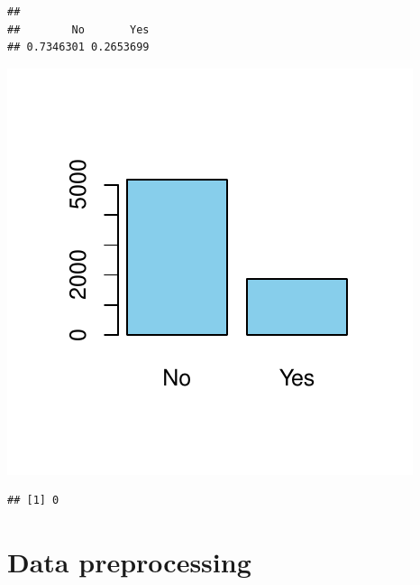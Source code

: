 \documentclass[
  twoside]{article}
\newenvironment{Shaded}{\begin{snugshade}}{\end{snugshade}}
\newcommand{\AttributeTok}[1]{\textcolor[rgb]{0.13,0.29,0.53}{#1}}
\newcommand{\FunctionTok}[1]{\textcolor[rgb]{0.13,0.29,0.53}{\textbf{#1}}}
\newcommand{\NormalTok}[1]{#1}
\newcommand{\SpecialCharTok}[1]{\textcolor[rgb]{0.81,0.36,0.00}{\textbf{#1}}}
\newcommand{\StringTok}[1]{\textcolor[rgb]{0.31,0.60,0.02}{#1}}
\begin{document}
\begin{verbatim}
## 
##        No       Yes 
## 0.7346301 0.2653699
\end{verbatim}

\begin{Shaded}
\end{Shaded}

\includegraphics{Assigment2_files/figure-latex/unnamed-chunk-37-1.pdf}

\begin{Shaded}
\end{Shaded}

\begin{verbatim}
## [1] 0
\end{verbatim}

\hypertarget{data-preprocessing}{%
\section{Data preprocessing}\label{data-preprocessing}}
\end{document}
